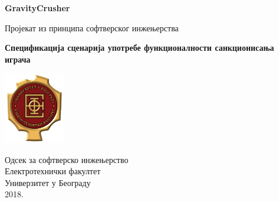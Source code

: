 \begin{titlepage}
	\begin{center}
	
		\vspace*{1cm}
		
		\Huge
		\textbf{GravityCrusher}
		
		\vspace{0.5cm}
		\LARGE
		Пројекат из принципа софтверског инжењерства
		
		\vspace{1.5cm}
		\Large		
		\textbf{Спецификација сценарија употребе функционалности санкционисања играча}
		
		\vfill
		
		\includegraphics[width=0.2\textwidth]{../../resources/etflogo}
		
		\large
		Одсек за софтверско инжењерство\\
		Електротехнички факултет\\
		Универзитет у Београду\\
		2018.
	
	\end{center}
\end{titlepage}
